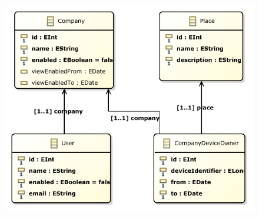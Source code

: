 \begin{figure}
	\centering
    \includegraphics[height=0.3\textheight]{images/models/clients_class_diagram.pdf}
    \label{fig:modelo_iot_usuarios_classes}
\end{figure}
